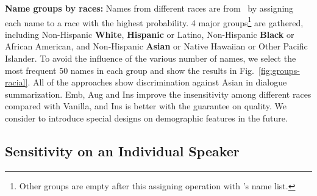 \textbf{Name groups by races:} Names from different races are from~\citet{tzioumis2018demographic} by assigning each name to a race with the highest probability. 4 major groups\footnote{Other groups are empty after this assigning operation with \citet{tzioumis2018demographic}'s name list.} are gathered, including Non-Hispanic \textbf{White}, \textbf{Hispanic} or Latino, Non-Hispanic \textbf{Black} or African American, and Non-Hispanic \textbf{Asian} or Native Hawaiian or Other Pacific Islander. %
To avoid the influence of the various number of names, we select the most frequent 50 names in each group and show the results in Fig.~\ref{fig:groups-racial}.
All of the approaches show discrimination against Asian in dialogue summarization. %
Emb, Aug and Ins improve the insensitivity among different races compared with Vanilla, and Ins is better with the guarantee on quality. We consider to introduce special designs on demographic features in the future.



\subsection{Sensitivity on an Individual Speaker}

